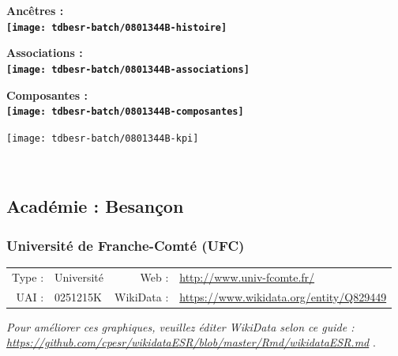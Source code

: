 \documentclass[12pt,french,]{article}
\begin{document}
\vspace{1cm}  
\begin{minipage}[b]{0.50\textwidth}\begin{center} \bf Ancêtres : \\  
\texttt{[image: tdbesr-batch/0801344B-histoire]} \end{center}\end{minipage}\begin{minipage}[b]{0.50\textwidth}\begin{center} \bf Associations : \\  
\texttt{[image: tdbesr-batch/0801344B-associations]} \end{center}\end{minipage}

\hrulefill

\begin{center} \bf Composantes : \\  
\texttt{[image: tdbesr-batch/0801344B-composantes]} \end{center}

\begin{center}\texttt{[image: tdbesr-batch/0801344B-kpi]} \end{center}\checkoddpage

\ifoddpage \fi ~\newpage  

\hypertarget{acaduxe9mie-besanuxe7on}{%
\subsection{Académie : Besançon}\label{acaduxe9mie-besanuxe7on}}

\hypertarget{universituxe9-de-franche-comtuxe9-ufc}{%
\subsubsection{Université de Franche-Comté
(UFC)}\label{universituxe9-de-franche-comtuxe9-ufc}}

\begin{tabular*}{\textwidth}{rp{5cm}rl}  
\hline  
Type : & Université & Web : &\href{http://www.univ-fcomte.fr/}{http://www.univ-fcomte.fr/} \\  
UAI : & 0251215K & WikiData : & \href{https://www.wikidata.org/entity/Q829449}{https://www.wikidata.org/entity/Q829449} \\  
\hline  
\end{tabular*}

\textit{\scriptsize Pour améliorer ces graphiques, veuillez éditer WikiData selon ce guide :  \href{https://github.com/cpesr/wikidataESR/blob/master/Rmd/wikidataESR.md}{https://github.com/cpesr/wikidataESR/blob/master/Rmd/wikidataESR.md}}
.
\end{document}
